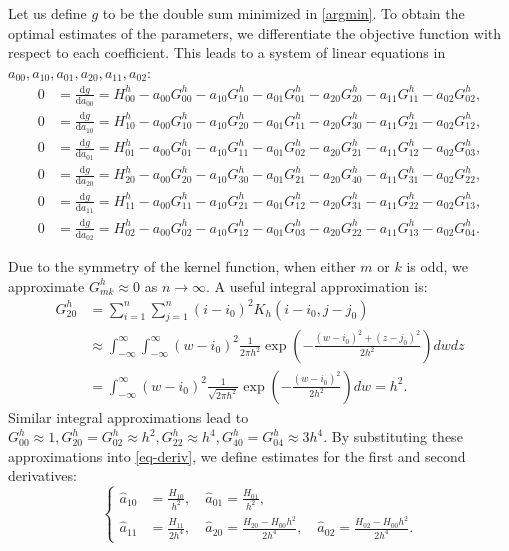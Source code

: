 \documentclass{article}
\def\ha{\hat{a}}
\begin{document}
Let us define $g$ to be the double sum minimized in \eqref{argmin}. To obtain the optimal estimates of the parameters, we differentiate the objective function with respect to each coefficient. This leads to a system of linear equations in $a_{00},a_{10},a_{01},a_{20},a_{11},a_{02}$: 
\begin{equation}
	\label{eq-deriv}
	\begin{aligned}
		0 &= \frac{\mathrm{d} g}{\mathrm{d}a_{00}} = H^h_{00} - a_{00}G^h_{00} - a_{10}G^h_{10} - a_{01}G^h_{01} - a_{20}G^h_{20} - a_{11}G^h_{11} - a_{02}G^h_{02}, \\
		0 &= \frac{\mathrm{d} g}{\mathrm{d}a_{10}} = H^h_{10} - a_{00}G^h_{10} - a_{10}G^h_{20} - a_{01}G^h_{11} - a_{20}G^h_{30} - a_{11}G^h_{21} - a_{02}G^h_{12}, \\
		0 &= \frac{\mathrm{d} g}{\mathrm{d}a_{01}} = H^h_{01} - a_{00}G^h_{01} - a_{10}G^h_{11} - a_{01}G^h_{02} - a_{20}G^h_{21} - a_{11}G^h_{12} - a_{02}G^h_{03}, \\
		0 &= \frac{\mathrm{d} g}{\mathrm{d}a_{20}} = H^h_{20} - a_{00}G^h_{20} - a_{10}G^h_{30} - a_{01}G^h_{21} - a_{20}G^h_{40} - a_{11}G^h_{31} - a_{02}G^h_{22}, \\
		0 &= \frac{\mathrm{d} g}{\mathrm{d}a_{11}} = H^h_{11} - a_{00}G^h_{11} - a_{10}G^h_{21} - a_{01}G^h_{12} - a_{20}G^h_{31} - a_{11}G^h_{22} - a_{02}G^h_{13}, \\
		0 &= \frac{\mathrm{d} g}{\mathrm{d}a_{02}} = H^h_{02} - a_{00}G^h_{02} - a_{10}G^h_{12} - a_{01}G^h_{03} - a_{20}G^h_{22} - a_{11}G^h_{13} - a_{02}G^h_{04}.
	\end{aligned}
\end{equation}

Due to the symmetry of the kernel function, when either $m$ or $k$ is odd, we approximate $G^h_{mk} \approx 0$ as $n \to \infty$.
A useful integral approximation is:
\begin{equation*}
	\begin{aligned}
		G^h_{20} &= \sum_{i=1}^{n}\sum_{j=1}^{n}(i-i_0)^2K_h(i-i_0,j-j_0) \\
		&\approx \int_{-\infty}^{\infty}\int_{-\infty}^{\infty}(w-i_0)^2\frac{1}{2\pi h^2}\exp\left(-\frac{(w-i_0)^2+(z-j_0)^2}{2h^2}\right)dwdz \\
		&= \int_{-\infty}^{\infty}(w-i_0)^2\frac{1}{\sqrt{2\pi h^2}}\exp\left(-\frac{(w-i_0)^2}{2h^2}\right)dw=h^2. 
	\end{aligned}
\end{equation*}
Similar integral approximations lead to  $G^h_{00} \approx 1, 
G^h_{20}=  G^h_{02}\approx h^2,
G^h_{22} \approx h^4, G^h_{40} = G^h_{04} \approx 3h^4.$ 
By substituting these approximations into \eqref{eq-deriv}, we define  estimates for the first and second derivatives: 
\begin{equation*}
	\left\{
	\begin{aligned}
		\ha_{10} &= \frac{H_{10}}{h^2}, \quad \ha_{01} = \frac{H_{01}}{h^2}, \\
		\ha_{11} &= \frac{H_{11}}{2h^4}, \quad \ha_{20} = \frac{H_{20} - H_{00}h^2}{2h^4}, \quad \ha_{02} = \frac{H_{02} - H_{00}h^2}{2h^4}.
	\end{aligned}
	\right.
\end{equation*}
\end{document}
